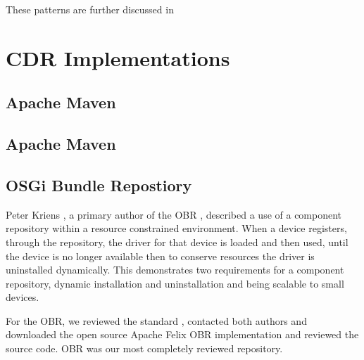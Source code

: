 These patterns are further discussed in \cite{Hnetynka2006}


\section{CDR Implementations}
\label{background.icdrs}

\subsection{Apache Maven}

\subsection{Apache Maven}



\subsection{OSGi Bundle Repostiory}
Peter Kriens \cite{kriens_osgi_2008}, 
a primary author of the OBR \cite{the_osgi_alliance_rfc-0112_2006}, described a use of a component repository within a resource constrained environment.
When a device registers, 
through the repository, the driver for that device is loaded and then used, until the device is no longer available
then to conserve resources the driver is uninstalled dynamically. 
This demonstrates two requirements for a component repository, dynamic installation and uninstallation and being scalable to small devices.

For the OBR, we reviewed the standard \cite{the_osgi_alliance_rfc-0112_2006}, 
contacted both authors \cite{kriens_osgi_2008, richard_s._hall_obr_2008} 
and downloaded the open source Apache Felix OBR implementation and reviewed the source code.
OBR was our most completely reviewed repository.

